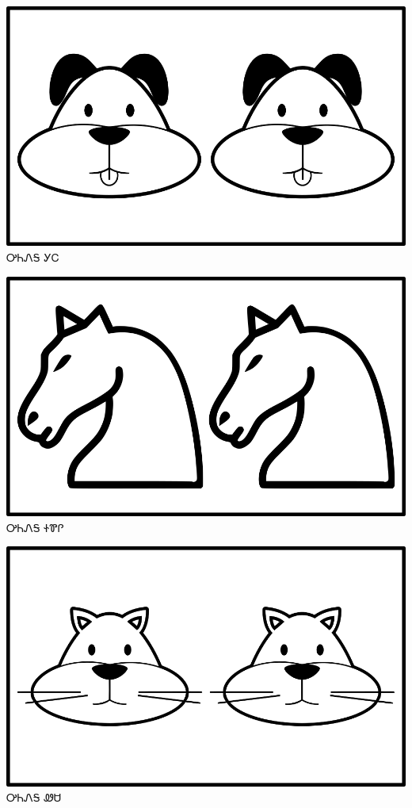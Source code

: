 \documentclass[avery5371]{flashcards}%
\begin{document}
    \begin{flashcard}{
        \includegraphics[width=0.95\columnwidth,height=.51\columnwidth,keepaspectratio]{../artwork/objects-animate/anitali-gihli}
    }
        \Huge ᎤᏂᏁᎦ ᎩᏟ
    \end{flashcard}

    \begin{flashcard}{
        \includegraphics[width=0.95\columnwidth,height=.51\columnwidth,keepaspectratio]{../artwork/objects-animate/anitali-soquili}
    }
        \Huge ᎤᏂᏁᎦ ᏐᏈᎵ
    \end{flashcard}

    \begin{flashcard}{
        \includegraphics[width=0.95\columnwidth,height=.51\columnwidth,keepaspectratio]{../artwork/objects-animate/anitali-wesa}
    }
        \Huge ᎤᏂᏁᎦ ᏪᏌ
    \end{flashcard}
\end{document}
